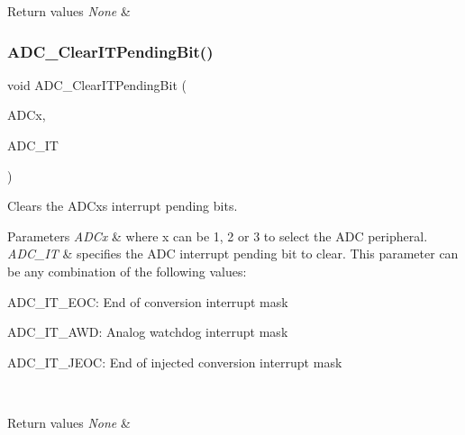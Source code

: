 \begin{DoxyRetVals}{Return values}
{\em None} & \\
\hline
\end{DoxyRetVals}
\mbox{\label{group___a_d_c___private___functions_ga601c6a67bd883eb631ecc7aa5e999b9c}} 
\subsubsection{\texorpdfstring{ADC\_ClearITPendingBit()}{ADC\_ClearITPendingBit()}}
{\footnotesize\ttfamily void A\+D\+C\+\_\+\+Clear\+I\+T\+Pending\+Bit (\begin{DoxyParamCaption}\item[{\mbox{\hyperlink{struct_a_d_c___type_def}{A\+D\+C\+\_\+\+Type\+Def}} $\ast$}]{A\+D\+Cx,  }\item[{uint16\+\_\+t}]{A\+D\+C\+\_\+\+IT }\end{DoxyParamCaption})}



Clears the A\+D\+Cx\textquotesingle{}s interrupt pending bits. 


\begin{DoxyParams}{Parameters}
{\em A\+D\+Cx} & where x can be 1, 2 or 3 to select the A\+DC peripheral. \\
\hline
{\em A\+D\+C\+\_\+\+IT} & specifies the A\+DC interrupt pending bit to clear. This parameter can be any combination of the following values\+: \begin{DoxyItemize}
\item A\+D\+C\+\_\+\+I\+T\+\_\+\+E\+OC\+: End of conversion interrupt mask \item A\+D\+C\+\_\+\+I\+T\+\_\+\+A\+WD\+: Analog watchdog interrupt mask \item A\+D\+C\+\_\+\+I\+T\+\_\+\+J\+E\+OC\+: End of injected conversion interrupt mask \end{DoxyItemize}
\\
\hline
\end{DoxyParams}

\begin{DoxyRetVals}{Return values}
{\em None} & \\
\hline
\end{DoxyRetVals}
\mbox{\label{group___a_d_c___private___functions_ga40882d399e3371755ed610c1134e634e}} 
